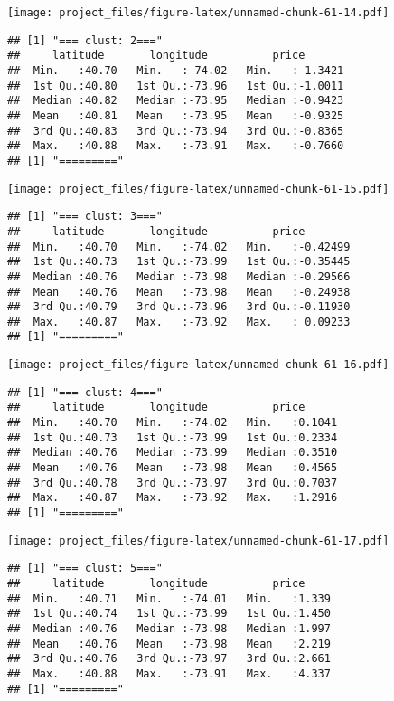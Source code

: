 \documentclass[
]{article}
\begin{document}
\texttt{[image: project\_files/figure-latex/unnamed-chunk-61-14.pdf]}

\begin{verbatim}
## [1] "=== clust: 2==="
##     latitude       longitude          price        
##  Min.   :40.70   Min.   :-74.02   Min.   :-1.3421  
##  1st Qu.:40.80   1st Qu.:-73.96   1st Qu.:-1.0011  
##  Median :40.82   Median :-73.95   Median :-0.9423  
##  Mean   :40.81   Mean   :-73.95   Mean   :-0.9325  
##  3rd Qu.:40.83   3rd Qu.:-73.94   3rd Qu.:-0.8365  
##  Max.   :40.88   Max.   :-73.91   Max.   :-0.7660  
## [1] "========="
\end{verbatim}

\texttt{[image: project\_files/figure-latex/unnamed-chunk-61-15.pdf]}

\begin{verbatim}
## [1] "=== clust: 3==="
##     latitude       longitude          price         
##  Min.   :40.70   Min.   :-74.02   Min.   :-0.42499  
##  1st Qu.:40.73   1st Qu.:-73.99   1st Qu.:-0.35445  
##  Median :40.76   Median :-73.98   Median :-0.29566  
##  Mean   :40.76   Mean   :-73.98   Mean   :-0.24938  
##  3rd Qu.:40.79   3rd Qu.:-73.96   3rd Qu.:-0.11930  
##  Max.   :40.87   Max.   :-73.92   Max.   : 0.09233  
## [1] "========="
\end{verbatim}

\texttt{[image: project\_files/figure-latex/unnamed-chunk-61-16.pdf]}

\begin{verbatim}
## [1] "=== clust: 4==="
##     latitude       longitude          price       
##  Min.   :40.70   Min.   :-74.02   Min.   :0.1041  
##  1st Qu.:40.73   1st Qu.:-73.99   1st Qu.:0.2334  
##  Median :40.76   Median :-73.99   Median :0.3510  
##  Mean   :40.76   Mean   :-73.98   Mean   :0.4565  
##  3rd Qu.:40.78   3rd Qu.:-73.97   3rd Qu.:0.7037  
##  Max.   :40.87   Max.   :-73.92   Max.   :1.2916  
## [1] "========="
\end{verbatim}

\texttt{[image: project\_files/figure-latex/unnamed-chunk-61-17.pdf]}

\begin{verbatim}
## [1] "=== clust: 5==="
##     latitude       longitude          price      
##  Min.   :40.71   Min.   :-74.01   Min.   :1.339  
##  1st Qu.:40.74   1st Qu.:-73.99   1st Qu.:1.450  
##  Median :40.76   Median :-73.98   Median :1.997  
##  Mean   :40.76   Mean   :-73.98   Mean   :2.219  
##  3rd Qu.:40.76   3rd Qu.:-73.97   3rd Qu.:2.661  
##  Max.   :40.88   Max.   :-73.91   Max.   :4.337  
## [1] "========="
\end{verbatim}
\end{document}

